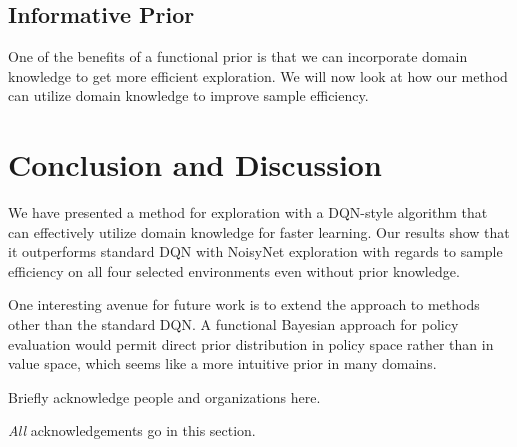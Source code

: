 \documentclass[]{uai2021} %
\begin{document}
\subsection{Informative Prior}
One of the benefits of a functional prior is that we can incorporate domain knowledge to
get more efficient exploration. We will now look at how our method can utilize domain
knowledge to improve sample efficiency.





\section{Conclusion and Discussion}
We have presented a method for exploration with a DQN-style algorithm that can
effectively utilize domain knowledge for faster learning. Our results show that
it outperforms standard DQN with NoisyNet exploration with regards to sample efficiency
on all four selected environments even without prior knowledge.

One interesting avenue for future work is to extend the approach to methods other than
the standard DQN. A functional Bayesian approach for policy evaluation would permit direct
prior distribution in policy space rather than in value space, which seems like a
more intuitive prior in many domains.


\begin{acknowledgements} %
    Briefly acknowledge people and organizations here.

    \emph{All} acknowledgements go in this section.
\end{acknowledgements}
\end{document}
